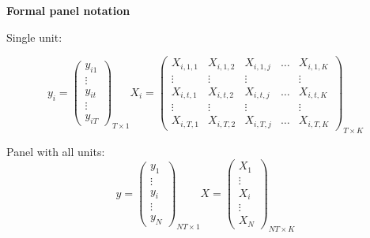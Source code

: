 \documentclass{beamer}
\begin{document}
\begin{frame}[plain]
	\begin{center}
	\textbf{Formal panel notation}
	\end{center}
Single unit:

\[ y_i = \left( \begin{array}{c}
y_{i1} \\
\vdots \\
y_{it} \\
\vdots \\
y_{iT}
\end{array} \right)_{T\times 1}
%
X_i = \left( \begin{array}{ccccc}
X_{i,1,1} & X_{i,1,2} & X_{i,1,j} & \dots & X_{i,1,K} \\
\vdots & \vdots & \vdots & & \vdots \\
X_{i,t,1} & X_{i,t,2} & X_{i,t,j} & \dots & X_{i,t,K} \\
\vdots & \vdots & \vdots & & \vdots \\
X_{i,T,1} & X_{i,T,2} & X_{i,T,j} & \dots & X_{i,T,K} 
\end{array} \right)_{T\times K}
\]

Panel with all units:
\[ y = \left( \begin{array}{c}
y_{1} \\
\vdots \\
y_{i} \\
\vdots \\
y_{N}
\end{array} \right)_{NT\times 1}
%
X = \left( \begin{array}{c}
X_1  \\
\vdots \\
X_i \\
\vdots \\
X_N
\end{array} \right)_{NT \times K}
\]


\end{frame}
\end{document}
